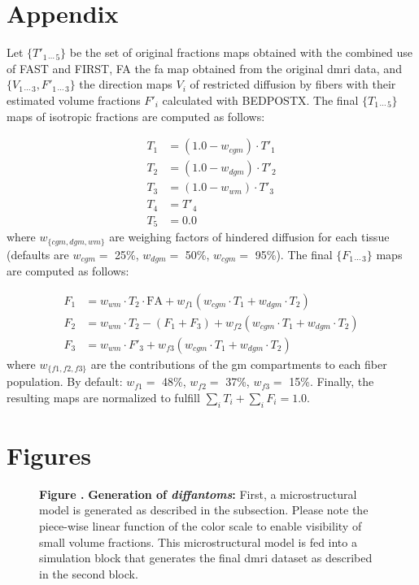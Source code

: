 \documentclass[english]{frontiers/frontiersSCNS} %
\begin{document}
\glsresetall
\linenumbers
\section*{Appendix}\label{sec:appendix}
Let $\{T'_{1\,\cdots\,5}\}$ be the set of original fractions maps obtained with the combined use of FAST and FIRST, FA the
  \gls*{fa} map obtained from the original \gls*{dmri} data, and $\{V_{1\,\cdots\,3}, F'_{1\,\cdots\,3}\}$ the direction
  maps $V_i$ of restricted diffusion by fibers with their estimated volume fractions $F'_i$ calculated with BEDPOSTX.
The final $\{T_{1\,\cdots\,5}\}$ maps of isotropic fractions are computed as follows:

  \begin{align*}
  T_1 &= (1.0-w_{cgm}) \cdot T'_1 \\
  T_2 &= (1.0-w_{dgm}) \cdot T'_2 \\
  T_3 &= (1.0-w_{wm}) \cdot T'_3 \\
  T_4 &= T'_4 \\
  T_5 &= 0.0
  \end{align*}
where $w_{\{cgm, dgm, wm\}}$ are weighing factors of hindered diffusion for each tissue
  (defaults are $w_{cgm} =$ 25\%, $w_{dgm} =$ 50\%, $w_{cgm} =$ 95\%).
The final $\{F_{1\,\cdots\,3}\}$ maps are computed as follows:

\begin{align*}
F_1 &= w_{wm} \cdot T_2 \cdot \text{FA} + w_{f1} (w_{cgm} \cdot T_1 + w_{dgm} \cdot T_2) \\
F_2 &= w_{wm} \cdot T_2 - (F_1 + F_3) + w_{f2} (w_{cgm} \cdot T_1 + w_{dgm} \cdot T_2) \\
F_3 &= w_{wm} \cdot F'_3 + w_{f3} (w_{cgm} \cdot T_1 + w_{dgm} \cdot T_2)
\end{align*}
where $w_{\{f1, f2, f3\}}$ are the contributions of the \gls*{gm} compartments to each fiber population.
By default: $w_{f1} = $ 48\%, $w_{f2} = $ 37\%, $w_{f3} = $ 15\%.
Finally, the resulting maps are normalized to fulfill $\sum_i T_i + \sum_i F_i = 1.0$.

\newpage
\section*{Figures}

\begin{figure}[h!]
\begin{center}

\end{center}
\textbf{\label{fig:figure1} Figure . }%
{\textbf{Generation of \emph{diffantoms}:} First, a microstructural model is generated as described
  in the  subsection.
Please note the piece-wise linear function of the color scale to enable visibility of small volume fractions.
This microstructural model is fed into a simulation block that generates the final \gls*{dmri} dataset
  as described in the second block.
}
\end{figure}
\end{document}
